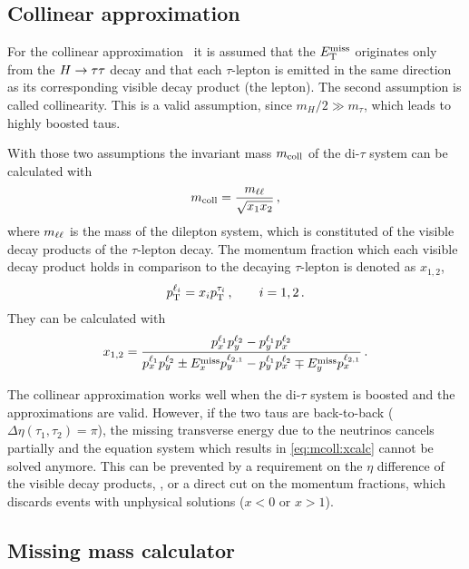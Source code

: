 \subsection{Collinear approximation}\label{sub:event_selection:mcoll}

For the collinear approximation~\cite{MCollAssumption,MColl} it is assumed that the $E_\text{T}^\text{miss}$ originates only
from the $H \to \tau \tau$ decay and that each $\tau$-lepton is emitted in the same direction as its corresponding visible decay
product (the lepton).
The second assumption is called collinearity.
This is a valid assumption, since $m_H / 2 \gg m_\tau$, which leads to highly boosted taus.

With those two assumptions the invariant mass $m_\text{coll}$ of the di-$\tau$ system can be calculated with
\begin{equation}
    \label{eq:mcoll}
    m_\text{coll} = \frac{m_{\ell\ell}}{\sqrt{x_1 x_2}} \,,
\end{equation}
where $m_{\ell\ell}$ is the mass of the dilepton system, which is constituted of the visible decay products of the
$\tau$-lepton decay.
The momentum fraction which each visible decay product holds in comparison to the decaying $\tau$-lepton
is denoted as $x_{1,2}$,
\begin{equation}
    \label{eq:mcoll:xdef}
    p_\text{T}^{\ell_i} = x_i p_\text{T}^{\tau_i} \,, \qquad i = 1,2 \,.
\end{equation}
They can be calculated with
\begin{equation}
    \label{eq:mcoll:xcalc}
    x_{1,2} = \frac{p_x^{\ell_1} p_y^{\ell_2} - p_y^{\ell_1} p_x^{\ell_2}}{p_x^{\ell_1} p_y^{\ell_2} \pm E_x^\text{miss} p_y^{\ell_{2,1}} - p_y^{\ell_1} p_x^{\ell_2} \mp E_y^\text{miss} p_x^{\ell_{2,1}}} \,.
\end{equation}

The collinear approximation works well when the di-$\tau$ system is boosted and the approximations are valid.
However, if the two taus are back-to-back ($\Delta \eta (\tau_1,\tau_2) = \pi$), the missing transverse energy
due to the neutrinos cancels partially and the equation system which results in \cref{eq:mcoll:xcalc} cannot
be solved anymore.
This can be prevented by a requirement on the $\eta$ difference of the visible decay products, \detall, or a direct
cut on the momentum fractions, which discards events with unphysical solutions ($x < 0$ or $x > 1$).

\subsection{Missing mass calculator}\label{sub:event_selection:mmc}

